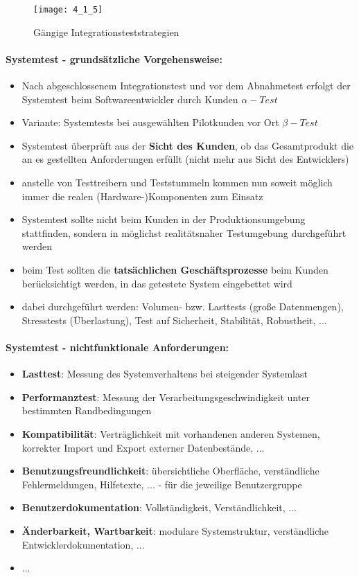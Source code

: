 \begin{figure}[h]
	\centering
	\caption{Gängige Integrationsteststrategien}
	\texttt{[image: 4\_1\_5]}
\end{figure}

\paragraph{Systemtest - grundsätzliche Vorgehensweise:}
\begin{itemize}
	\item Nach abgeschlossenem Integrationstest und vor dem Abnahmetest erfolgt der Systemtest beim Softwareentwickler durch Kunden $\alpha-Test$
	\item Variante: Systemtests bei ausgewählten Pilotkunden vor Ort $\beta-Test$
	\item Systemtest überprüft aus der \textbf{Sicht des Kunden}, ob das Gesamtprodukt die an es gestellten Anforderungen erfüllt (nicht mehr aus Sicht des Entwicklers)
	\item anstelle von Testtreibern und Teststummeln kommen nun soweit möglich immer die realen (Hardware-)Komponenten zum Einsatz
	\item Systemtest sollte nicht beim Kunden in der Produktionsumgebung stattfinden, sondern in möglichst realitätsnaher Testumgebung durchgeführt werden
	\item beim Test sollten die \textbf{tatsächlichen Geschäftsprozesse} beim Kunden berücksichtigt werden, in das getestete System eingebettet wird
	\item dabei durchgeführt werden: Volumen- bzw. Lasttests (große Datenmengen), Stresstests (Überlastung), Test auf Sicherheit, Stabilität, Robustheit, ...
\end{itemize}

\paragraph{Systemtest - nichtfunktionale Anforderungen:}
\begin{itemize}
	\item  \textbf{Lasttest}: Messung des Systemverhaltens bei steigender Systemlast
	\item \textbf{Performanztest}: Messung der Verarbeitungsgeschwindigkeit unter bestimmten Randbedingungen
	\item \textbf{Kompatibilität}: Verträglichkeit mit vorhandenen anderen Systemen, korrekter Import und Export externer Datenbestände, ...
	\item \textbf{Benutzungsfreundlichkeit}: übersichtliche Oberfläche, verständliche Fehlermeldungen, Hilfetexte, ... - für die jeweilige Benutzergruppe
	\item \textbf{Benutzerdokumentation}: Vollständigkeit, Verständlichkeit, ...
	\item \textbf{Änderbarkeit, Wartbarkeit}: modulare Systemstruktur, verständliche Entwicklerdokumentation, ...
	\item ...
\end{itemize}

